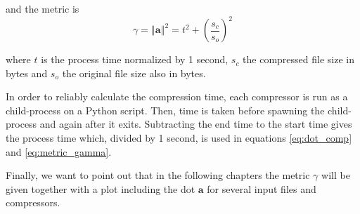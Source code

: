 and the metric is
\begin{equation} \label{eq:metric_gamma}
\gamma = \left\Vert \mathbf{a} \right\Vert ^2 = t^2 + \left(\frac{s_c}{s_o}\right)^2
\end{equation}

where $t$ is the process time normalized by 1 second, $s_c$ the compressed file size in bytes and $s_o$ the original file size also in bytes.

In order to reliably calculate the compression time, each compressor is run as a child-process on a Python script. Then, time is taken before spawning the child-process and again after it exits. Subtracting the end time to the start time gives the process time which, divided by 1 second, is used in equations \ref{eq:dot_comp} and \ref{eq:metric_gamma}.

Finally, we want to point out that in the following chapters the metric $\gamma$ will be given together with a plot including the dot $\mathbf{a}$ for several input files and compressors.
